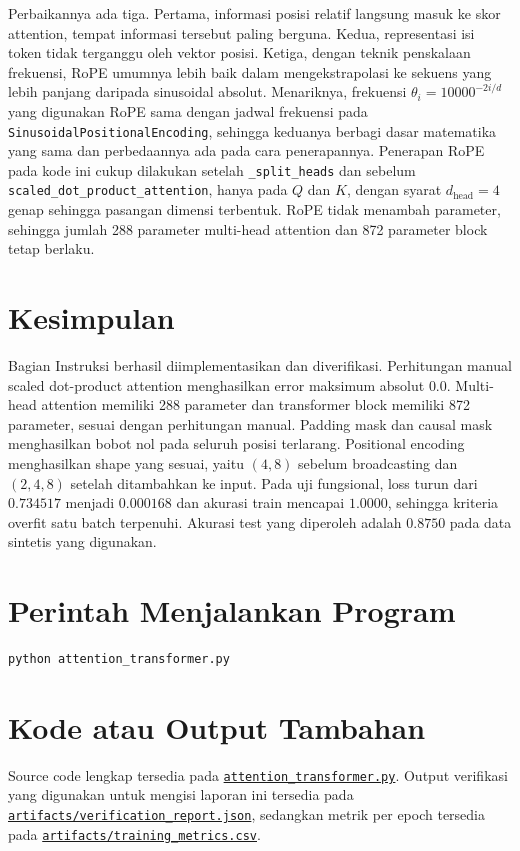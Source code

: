 \documentclass[12pt,a4paper]{article}
\newcommand{\code}[1]{\texttt{\small #1}}
\newcommand{\sourcecodelink}{\href{https://github.com/Universitas-Cakrawala/tugas-deep-learning-sesi-10/blob/main/attention_transformer.py}{\nolinkurl{attention_transformer.py}}}
\newcommand{\verificationjsonlink}{\href{https://github.com/Universitas-Cakrawala/tugas-deep-learning-sesi-10/blob/main/artifacts/verification_report.json}{\nolinkurl{artifacts/verification_report.json}}}
\newcommand{\metricslink}{\href{https://github.com/Universitas-Cakrawala/tugas-deep-learning-sesi-10/blob/main/artifacts/training_metrics.csv}{\nolinkurl{artifacts/training_metrics.csv}}}
\begin{document}
Perbaikannya ada tiga. Pertama, informasi posisi relatif langsung masuk ke skor attention, tempat informasi tersebut paling berguna. Kedua, representasi isi token tidak terganggu oleh vektor posisi. Ketiga, dengan teknik penskalaan frekuensi, RoPE umumnya lebih baik dalam mengekstrapolasi ke sekuens yang lebih panjang daripada sinusoidal absolut. Menariknya, frekuensi $\theta_i = 10000^{-2i/d}$ yang digunakan RoPE sama dengan jadwal frekuensi pada \code{SinusoidalPositionalEncoding}, sehingga keduanya berbagi dasar matematika yang sama dan perbedaannya ada pada cara penerapannya. Penerapan RoPE pada kode ini cukup dilakukan setelah \code{\_split\_heads} dan sebelum \code{scaled\_dot\_product\_attention}, hanya pada $Q$ dan $K$, dengan syarat $d_{\text{head}}=4$ genap sehingga pasangan dimensi terbentuk. RoPE tidak menambah parameter, sehingga jumlah 288 parameter multi-head attention dan 872 parameter block tetap berlaku.

\section{Kesimpulan}
Bagian Instruksi berhasil diimplementasikan dan diverifikasi. Perhitungan
manual scaled dot-product attention menghasilkan error maksimum absolut
$0.0$. Multi-head attention memiliki 288 parameter dan transformer block
memiliki 872 parameter, sesuai dengan perhitungan manual. Padding mask dan
causal mask menghasilkan bobot nol pada seluruh posisi terlarang. Positional
encoding menghasilkan shape yang sesuai, yaitu $(4,8)$ sebelum broadcasting
dan $(2,4,8)$ setelah ditambahkan ke input. Pada uji fungsional, loss turun
dari $0.734517$ menjadi $0.000168$ dan akurasi train mencapai $1.0000$,
sehingga kriteria overfit satu batch terpenuhi. Akurasi test yang diperoleh
adalah $0.8750$ pada data sintetis yang digunakan.

\appendix
\section{Perintah Menjalankan Program}
\begin{lstlisting}[language=bash]
python attention_transformer.py
\end{lstlisting}

\section{Kode atau Output Tambahan}
Source code lengkap tersedia pada \sourcecodelink. Output verifikasi yang
digunakan untuk mengisi laporan ini tersedia pada \verificationjsonlink,
sedangkan metrik per epoch tersedia pada \metricslink.
\end{document}
